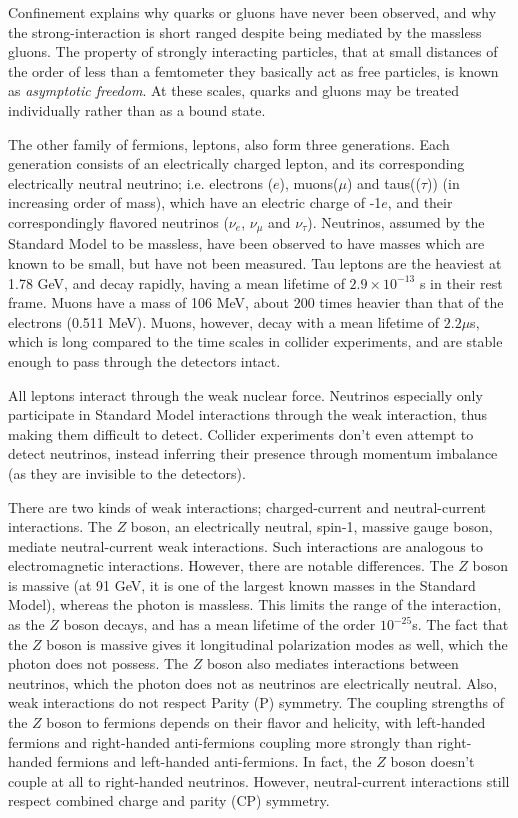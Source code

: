 \documentclass[12pt,a4paper,openright,twoside]{report}
\begin{document}
Confinement explains why quarks or gluons have never been observed, and why the strong-interaction is short ranged despite being mediated by the massless gluons. The property of strongly interacting particles, that at small distances of the order of less than a femtometer they basically act as free particles, is known as \textit{asymptotic freedom}. At these scales, quarks and gluons may be treated individually rather than as a bound state. 

The other family of fermions, leptons, also form three generations. Each generation consists of an electrically charged lepton, and its corresponding electrically neutral neutrino; i.e. electrons ($e$), muons($\mu$) and taus(($\tau$)) (in increasing order of mass), which have an electric charge of -1$e$, and their correspondingly flavored neutrinos ($\nu_e$, $\nu_{\mu}$ and $\nu_{\tau}$). Neutrinos, assumed by the Standard Model to be massless, have been observed to have masses \cite{nu1,nu2,nu3} which are known to be small, but have not been measured. Tau leptons are the heaviest at 1.78 GeV, and decay rapidly, having a mean lifetime of $2.9\times 10^{-13}$ s in their rest frame. Muons have a mass of 106 MeV, about 200 times heavier than that of the electrons (0.511 MeV). Muons, however, decay with a mean lifetime of $2.2 \mu$s, which is long compared to the time scales in collider experiments, and are stable enough to pass through the detectors intact.

All leptons interact through the weak nuclear force. Neutrinos especially only participate in Standard Model interactions through the weak interaction, thus making them difficult to detect. Collider experiments don't even attempt to detect neutrinos, instead inferring their presence through momentum imbalance (as they are invisible to the detectors). 

There are two kinds of weak interactions; charged-current and neutral-current interactions. The $Z$ boson, an electrically neutral, spin-1, massive gauge boson, mediate neutral-current weak interactions. Such interactions are analogous to electromagnetic interactions. However, there are notable differences. The $Z$ boson is massive (at 91 GeV, it is one of the largest known masses in the Standard Model), whereas the photon is massless. This limits the range of the interaction, as the $Z$ boson decays, and has a mean lifetime of the order $10^{-25}$s. The fact that the $Z$ boson is massive gives it longitudinal polarization modes\cite{quarks_and_leptons} as well, which the photon does not possess. The $Z$ boson also mediates interactions between neutrinos, which the photon does not as neutrinos are electrically neutral. Also, weak interactions do not respect Parity (P) symmetry. The coupling strengths of the $Z$ boson to fermions depends on their flavor and helicity, with left-handed fermions and right-handed anti-fermions coupling more strongly than right-handed fermions and left-handed anti-fermions. In fact, the $Z$ boson doesn't couple at all to right-handed neutrinos. However, neutral-current interactions still respect combined charge and parity (CP) symmetry.
\end{document}
